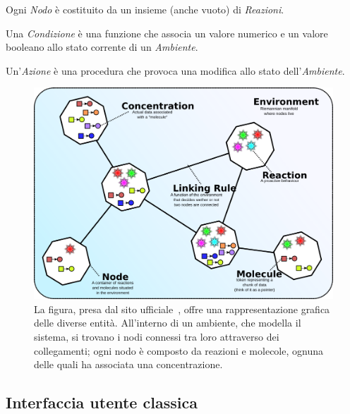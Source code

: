 \begin{description}
                    Ogni \emph{Nodo} è costituito da un insieme (anche vuoto) di \emph{Reazioni}.

                \item[\engEmph{Condition}\label{itm:cond}]
                    Una \emph{Condizione} è una funzione che associa un valore numerico e un valore booleano allo stato corrente di un \emph{Ambiente}.

                \item[\engEmph{Action}\label{itm:act}]
                        Un'\emph{Azione} è una procedura che provoca una modifica allo stato dell'\emph{Ambiente}.

            \end{description}

            \begin{figure}[htbp]\label{fig:model}
                \centering
                \includegraphics[scale=.4]{img/model}
                \caption{%
                    La figura, presa dal sito ufficiale~\cite{alchemistWeb}, offre una rappresentazione grafica delle diverse entità. All’interno di un ambiente, che modella il sistema, si trovano i nodi connessi tra loro attraverso dei collegamenti; ogni nodo è composto da reazioni e molecole, ognuna delle quali ha associata una concentrazione.
                }
            \end{figure}

        \subsection{Interfaccia utente classica}\label{sub:prevGui}

